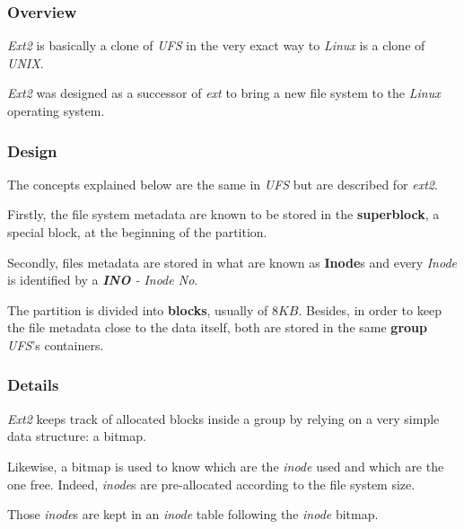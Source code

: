 
\begin{frame}
  \frametitle{Overview}

  \textit{Ext2} is basically a clone of \textit{UFS} in the very exact way
  to \textit{Linux} is a clone of \textit{UNIX}.

  \-

  \textit{Ext2} was designed as a successor of \textit{ext} to bring a new
  file system to the \textit{Linux} operating system.
\end{frame}


\begin{frame}
  \frametitle{Design}

  The concepts explained below are the same in \textit{UFS} but are described
  for \textit{ext2}.

  \-

  Firstly, the file system metadata are known to be stored in the
  \textbf{superblock}, a special block, at the beginning of the partition.

  \-

  Secondly, files metadata are stored in what are known as \textbf{Inode}s
  and every \textit{Inode} is identified by a \textit{\textbf{INO} - Inode No}.

  \-

  The partition is divided into \textbf{blocks}, usually of $8 KB$.
  Besides, in order to keep the file metadata close to the data itself,
  both are stored in the same \textbf{group} \ie{} \textit{UFS}'s
  containers.
\end{frame}


\begin{frame}
  \frametitle{Details}

  \textit{Ext2} keeps track of allocated blocks inside a group by relying
  on a very simple data structure: a bitmap.

  \-

  Likewise, a bitmap is used to know which are the \textit{inode} used and
  which are the one free. Indeed, \textit{inode}s are pre-allocated according
  to the file system size.

  \-

  Those \textit{inode}s are kept in an \textit{inode} table following the
  \textit{inode} bitmap.
\end{frame}


